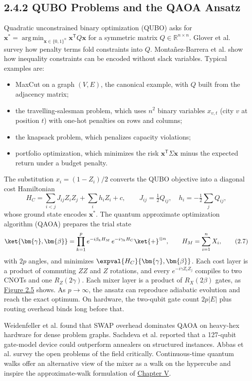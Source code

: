 \documentclass{report}
\theoremstyle{plain}
\theoremstyle{definition}
\theoremstyle{remark}
\newcommand{\R}{\mathbb{R}}
\DeclareMathOperator*{\argmin}{arg\,min}
\begin{document}
\subsection{2.4.2 QUBO Problems and the QAOA Ansatz}

Quadratic unconstrained binary optimization (QUBO) asks for $\bm{x}^{\ast}=\argmin_{\bm{x}\in\{0,1\}^n}\bm{x}^{\mathsf{T}}Q\bm{x}$ for a symmetric matrix $Q\in\R^{n\times n}$. Glover et al. \cite{glover2018qubo} survey how penalty terms fold constraints into $Q$. Monta{\~n}ez-Barrera et al. \cite{montanezbarrera2024unbalanced} show how inequality constraints can be encoded without slack variables. Typical examples are:
\begin{itemize}
\item MaxCut on a graph $(V,E)$, the canonical example, with $Q$ built from the adjacency matrix;
\item the travelling-salesman problem, which uses $n^2$ binary variables $x_{v,t}$ (city $v$ at position $t$) with one-hot penalties on rows and columns;
\item the knapsack problem, which penalizes capacity violations;
\item portfolio optimization, which minimizes the risk $\bm{x}^{\mathsf{T}}\Sigma\bm{x}$ minus the expected return under a budget penalty.
\end{itemize}
The substitution $x_i=(1-Z_i)/2$ converts the QUBO objective into a diagonal cost Hamiltonian
\hypertarget{eq:bg:hcost}{}\[
H_C=\sum_{i<j}J_{ij}Z_iZ_j+\sum_{i}h_iZ_i+c,\qquad J_{ij}=\tfrac12Q_{ij},\quad h_i=-\tfrac12\sum_{j}Q_{ij},
\tag{2.6}\]
whose ground state encodes $\bm{x}^{\ast}$. The quantum approximate optimization algorithm (QAOA) \cite{farhi2014qaoa} prepares the trial state
\hypertarget{eq:bg:qaoa}{}\[
\ket{\bm{\gamma},\bm{\beta}}=\prod_{k=1}^{p}e^{-i\beta_kH_M}\,e^{-i\gamma_kH_C}\ket{+}^{\otimes n},\qquad H_M=\sum_{i=1}^{n}X_i,
\tag{2.7}\]
with $2p$ angles, and minimizes $\expval{H_C}{\bm{\gamma},\bm{\beta}}$. Each cost layer is a product of commuting $ZZ$ and $Z$ rotations, and every $e^{-i\gamma Z_iZ_j}$ compiles to two CNOTs and one $R_Z(2\gamma)$. Each mixer layer is a product of $R_X(2\beta)$ gates, as \hyperref[fig:bg:qaoa]{Figure 2.5} shows. As $p\to\infty$, the ansatz can reproduce adiabatic evolution and reach the exact optimum. On hardware, the two-qubit gate count $2p|E|$ plus routing overhead binds long before that.

Weidenfeller et al. \cite{weidenfeller2022qaoascaling} found that SWAP overhead dominates QAOA on heavy-hex hardware for dense problem graphs. Sachdeva et al. \cite{sachdeva2024qaoa127} reported that a 127-qubit gate-model device could outperform annealers on structured instances. Abbas et al. \cite{abbas2024challengesqopt} survey the open problems of the field critically. Continuous-time quantum walks \cite{childs2009quantumwalk} offer an alternative view of the mixer as a walk on the hypercube and inspire the approximate-walk formulation of \hyperref[ch:nisq]{Chapter V}.
\end{document}
